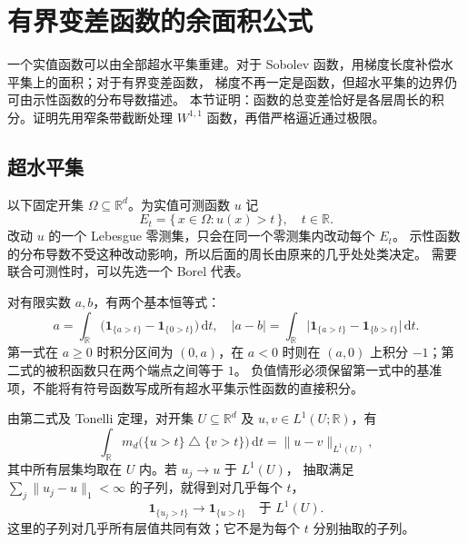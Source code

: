 \section{有界变差函数的余面积公式}
\label{b1:sec:2703}

一个实值函数可以由全部超水平集重建。对于 Sobolev 函数，用梯度长度补偿水平集上的面积；对于有界变差函数，
梯度不再一定是函数，但超水平集的边界仍可由示性函数的分布导数描述。
本节证明：函数的总变差恰好是各层周长的积分。证明先用窄条带截断处理
\(W^{1,1}\) 函数，再借严格逼近通过极限。


\subsection{超水平集}
\label{b1:subsec:270301}

以下固定开集 \(\Omega\subseteq\mathbb R^d\)。为实值可测函数 \(u\) 记
\[
 E_t=\{\,x\in\Omega:u(x)>t\,\},\quad t\in\mathbb R.
\]
改动 \(u\) 的一个 Lebesgue 零测集，只会在同一个零测集内改动每个 \(E_t\)。
示性函数的分布导数不受这种改动影响，所以后面的周长由原来的几乎处处类决定。
需要联合可测性时，可以先选一个 Borel 代表。

\ProseParagraphBreak

对有限实数 \(a,b\)，有两个基本恒等式：
\begin{equation}\label{b1:eq:bv-signed-layer-cake}
 a=\int_{\mathbb R}
       \bigl(\mathbf1_{\{a>t\}}-\mathbf1_{\{0>t\}}\bigr)\,\mathrm dt,
 \quad
 |a-b|=\int_{\mathbb R}
       \bigl|\mathbf1_{\{a>t\}}-\mathbf1_{\{b>t\}}\bigr|\,\mathrm dt.
\end{equation}
第一式在 \(a\ge0\) 时积分区间为 \((0,a)\)，在 \(a<0\) 时则在
\((a,0)\) 上积分 \(-1\)；第二式的被积函数只在两个端点之间等于 \(1\)。
负值情形必须保留第一式中的基准项，不能将有符号函数写成所有超水平集示性函数的直接积分。

\ProseParagraphBreak

由第二式及 Tonelli 定理，对开集 \(U\subseteq\mathbb R^d\) 及 \(u,v\in L^1(U;\mathbb R)\)，有
\begin{equation}\label{b1:eq:bv-level-set-l1-distance}
 \int_{\mathbb R}
 m_d\bigl(\{u>t\}\mathbin{\triangle}\{v>t\}\bigr)\,\mathrm dt
   =\|u-v\|_{L^1(U)},
\end{equation}
其中所有层集均取在 \(U\) 内。若 \(u_j\to u\) 于 \(L^1(U)\)，
抽取满足 \(\sum_j\|u_j-u\|_1<\infty\) 的子列，就得到对几乎每个 \(t\)，
\[
 \mathbf1_{\{u_j>t\}}\longrightarrow\mathbf1_{\{u>t\}}
       \quad\text{于 }L^1(U).
\]
这里的子列对几乎所有层值共同有效；它不是为每个 \(t\) 分别抽取的子列。

